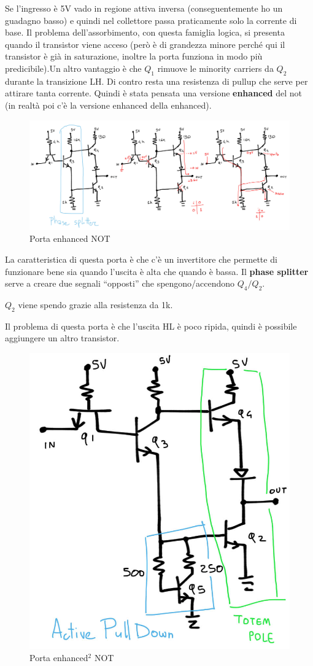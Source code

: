 \documentclass[
]{book}
\begin{document}
Se l'ingresso è 5V vado in regione attiva inversa (conseguentemente ho
un guadagno basso) e quindi nel collettore passa praticamente solo la
corrente di base. Il problema dell'assorbimento, con questa famiglia
logica, si presenta quando il transistor viene acceso (però è di
grandezza minore perché qui il transistor è già in saturazione, inoltre
la porta funziona in modo più predicibile).Un altro vantaggio è che
\(Q_{1}\) rimuove le minority carriers da \(Q_{2}\) durante la
transizione LH. Di contro resta una resistenza di pullup che serve per
attirare tanta corrente. \newline Quindi è stata pensata una versione
\textbf{enhanced} del not (in realtà poi c'è la versione enhanced della
enhanced).

\begin{figure}
\centering
\includegraphics[width=0.5\linewidth,height=\textheight,keepaspectratio]{immagini/21.jpg}
\caption{Porta enhanced NOT}
\end{figure}

La caratteristica di questa porta è che c'è un invertitore che permette
di funzionare bene sia quando l'uscita è alta che quando è bassa. Il
\textbf{phase splitter} serve a creare due segnali ``opposti'' che
spengono/accendono \(Q_{4}/Q_{2}\).

\(Q_{2}\) viene spendo grazie alla resistenza da 1k.

Il problema di questa porta è che l'uscita HL è poco ripida, quindi è
possibile aggiungere un altro transistor.

\begin{figure}
\centering
\includegraphics[width=0.3\linewidth,height=\textheight,keepaspectratio]{immagini/22.jpg}
\caption{Porta enhanced\(^{2}\) NOT}
\end{figure}
\end{document}
